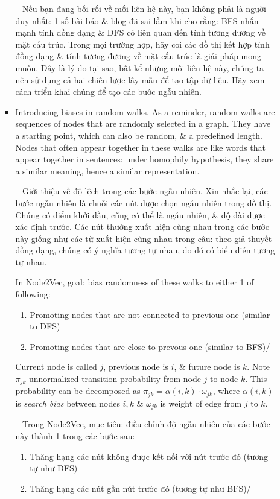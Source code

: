 \documentclass{article}
\begin{document}
\begin{itemize}
\begin{itemize}
\begin{itemize}
            -- Nếu bạn đang bối rối về mối liên hệ này, bạn không phải là người duy nhất: 1 số bài báo \& blog đã sai lầm khi cho rằng: BFS nhấn mạnh tính đồng dạng \& DFS có liên quan đến tính tương đương về mặt cấu trúc. Trong mọi trường hợp, hãy coi các đồ thị kết hợp tính đồng dạng \& tính tương đương về mặt cấu trúc là giải pháp mong muốn. Đây là lý do tại sao, bất kể những mối liên hệ này, chúng ta nên sử dụng cả hai chiến lược lấy mẫu để tạo tập dữ liệu. Hãy xem cách triển khai chúng để tạo các bước ngẫu nhiên.
            \item {\sf Introducing biases in random walks.} As a reminder, random walks are sequences of nodes that are randomly selected in a graph. They have a starting point, which can also be random, \& a predefined length. Nodes that often appear together in these walks are like words that appear together in sentences: under homophily hypothesis, they share a similar meaning, hence a similar representation.

            -- {\sf Giới thiệu về độ lệch trong các bước ngẫu nhiên.} Xin nhắc lại, các bước ngẫu nhiên là chuỗi các nút được chọn ngẫu nhiên trong đồ thị. Chúng có điểm khởi đầu, cũng có thể là ngẫu nhiên, \& độ dài được xác định trước. Các nút thường xuất hiện cùng nhau trong các bước này giống như các từ xuất hiện cùng nhau trong câu: theo giả thuyết đồng dạng, chúng có ý nghĩa tương tự nhau, do đó có biểu diễn tương tự nhau.

            In Node2Vec, goal: bias randomness of these walks to either 1 of following:
            \begin{enumerate}
                \item Promoting nodes that are not connected to previous one (similar to DFS)
                \item Promoting nodes that are close to prevous one (similar to BFS)/
            \end{enumerate}
            Current node is called $j$, previous node is $i$, \& future node is $k$. Note $\pi_{jk}$ unnormalized transition probability from node $j$ to node $k$. This probability can be decomposed as $\pi_{jk} = \alpha(i,k)\cdot\omega_{jk}$, where $\alpha(i,k)$ is {\it search bias} between nodes $i,k$ \& $\omega_{jk}$ is weight of edge from $j$ to $k$.

            -- Trong Node2Vec, mục tiêu: điều chỉnh độ ngẫu nhiên của các bước này thành 1 trong các bước sau:
            \begin{enumerate}
                \item Thăng hạng các nút không được kết nối với nút trước đó (tương tự như DFS)
                \item Thăng hạng các nút gần nút trước đó (tương tự như BFS)/


\end{enumerate}
\end{itemize}
\end{itemize}
\end{itemize}
\end{document}
